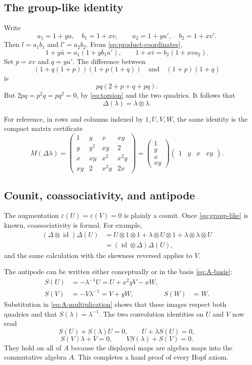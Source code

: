 \documentclass[11pt]{article}
\theoremstyle{remark}
\newcommand{\eps}{\varepsilon}
\newcommand{\ot}{\otimes}
\newcommand{\id}{\operatorname{id}}
\begin{document}
\subsection{The group-like identity}

Write
\[
 a_1=1+yu,\quad b_1=1+xv,
 \qquad a_2=1+yu',\quad b_2=1+xv'.
\]
Then $l=a_1b_1$ and $l'=a_2b_2$.  From
\eqref{eq:product-coordinates},
\[
 1+y\bar u=a_1(1+yb_1u'),
 \qquad
 1+x\bar v=b_2(1+xva_2).
\]
Set $p=xv$ and $q=yu'$.  The difference between
\[
 (1+q(1+p))(1+p(1+q))
 \quad\text{and}\quad (1+p)(1+q)
\]
is
\[
 pq(2+p+q+pq).
\]
But $2pq=p^2q=pq^2=0$, by \eqref{eq:torsion} and the two quadrics.
It follows that
\begin{equation}\label{eq:group-like}
 \Delta(\lambda)=\lambda\ot\lambda.
\end{equation}

For reference, in rows and columns indexed by $1,U,V,W$, the same identity
is the compact matrix certificate
\[
 M(\Delta\lambda)=
 \begin{pmatrix}
 1&y&x&xy\\
 y&y^2&xy&2\\
 x&xy&x^2&x^2y\\
 xy&2&x^2y&2x
 \end{pmatrix}
 =
 \begin{pmatrix}1\\y\\x\\xy\end{pmatrix}
 \begin{pmatrix}1&y&x&xy\end{pmatrix}.
\]

\subsection{Counit, coassociativity, and antipode}

The augmentation $\eps(U)=\eps(V)=0$ is plainly a counit.  Once
\eqref{eq:group-like} is known, coassociativity is formal.  For example,
\begin{align*}
 (\Delta\ot\id)\Delta(U)
 &=U\ot1\ot1+\lambda\ot U\ot1
   +\lambda\ot\lambda\ot U\\
 &=(\id\ot\Delta)\Delta(U),
\end{align*}
and the same calculation with the skewness reversed applies to $V$.

The antipode can be written either conceptually or in the basis
\eqref{eq:A-basis}:
\begin{align}
 S(U)&=-\lambda^{-1}U=U+x^2yV-xW,\nonumber\\
 S(V)&=-V\lambda^{-1}=V+yW,
 &S(W)&=W.\label{eq:antipode}
\end{align}
Substitution in \eqref{eq:A-multiplication} shows that these images respect
both quadrics and that $S(\lambda)=\lambda^{-1}$.  The two convolution
identities on $U$ and $V$ now read
\[
 S(U)+S(\lambda)U=0,
 \qquad U+\lambda S(U)=0,
\]
\[
 S(V)\lambda+V=0,
 \qquad VS(\lambda)+S(V)=0.
\]
They hold on all of $A$ because the displayed maps are algebra maps into the
commutative algebra $A$.  This completes a hand proof of every Hopf axiom.
\end{document}
